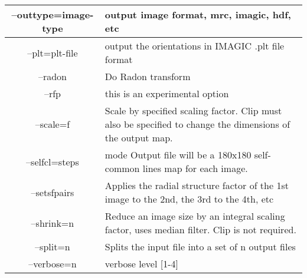 \begin{longtable}{|c||p{3.5in}|}
\\\hline   --outtype=image-type  &  output image format, mrc, imagic, hdf, etc
\\\hline   --plt=plt-file  &  output the orientations in IMAGIC .plt file format
\\\hline   --radon  &  Do Radon transform
\\\hline   --rfp  &  this is an experimental option
\\\hline   --scale=f  &  Scale by specified scaling factor. Clip must also be specified to change the dimensions of the output map.
\\\hline   --selfcl=steps  &  mode Output file will be a 180x180 self-common lines map for each image.
\\\hline   --setsfpairs  &  Applies the radial structure factor of the 1st image to the 2nd, the 3rd to the 4th, etc
\\\hline   --shrink=n  &  Reduce an image size by an integral scaling factor, uses median filter. Clip is not required.
\\\hline   --split=n  &  Splits the input file into a set of n output files
\\\hline
 --verbose=n  &  verbose level [1-4]
\\\hline
\end{longtable}

